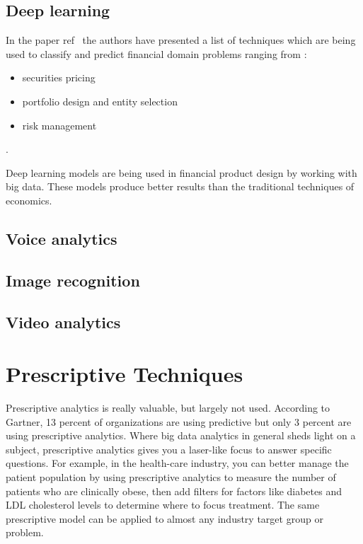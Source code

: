\section{Deep learning}
In the paper ref~ the authors have presented a list of techniques which are being used to classify and predict financial domain problems ranging from :
\begin{itemize}
	\item securities pricing
	\item portfolio design and entity selection
	\item risk management
\end{itemize}.

Deep learning models are being used in financial product design by working with big data. These models produce better results than the traditional techniques of economics. 

\section{Voice analytics}



\section{Image recognition}



\section{Video analytics}



\setlength{\footskip}{8mm}

\chapter{Prescriptive Techniques} 
\label{prescriptive-techniques}

Prescriptive analytics is really valuable, but largely not used. According to Gartner, 13 percent of organizations are using predictive but only 3 percent are using prescriptive analytics. Where big data analytics in general sheds light on a subject, prescriptive analytics gives you a laser-like focus to answer specific questions. For example, in the health-care industry, you can better manage the patient population by using prescriptive analytics to measure the number of patients who are clinically obese, then add filters for factors like diabetes and LDL cholesterol levels to determine where to focus treatment. The same prescriptive model can be applied to almost any industry target group or problem.





